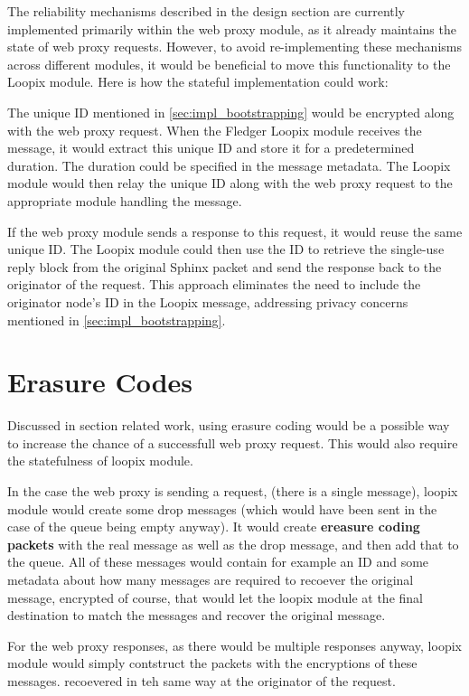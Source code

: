 \documentclass[a4paper,11pt,oneside]{report}
\begin{document}
The reliability mechanisms described in the design section are currently implemented primarily within the web proxy module, as it already maintains the state of web proxy requests. However, to avoid re-implementing these mechanisms across different modules, it would be beneficial to move this functionality to the Loopix module. Here is how the stateful implementation could work:

The unique ID mentioned in \autoref{sec:impl_bootstrapping} would be encrypted along with the web proxy request. When the Fledger Loopix module receives the message, it would extract this unique ID and store it for a predetermined duration. The duration could be specified in the message metadata. The Loopix module would then relay the unique ID along with the web proxy request to the appropriate module handling the message.

If the web proxy module sends a response to this request, it would reuse the same unique ID. The Loopix module could then use the ID to retrieve the single-use reply block from the original Sphinx packet and send the response back to the originator of the request. This approach eliminates the need to include the originator node's ID in the Loopix message, addressing privacy concerns mentioned in \autoref{sec:impl_bootstrapping}.

\section{Erasure Codes}
Discussed in section related work, using erasure coding would be a possible way to increase the chance of a successfull web proxy request. This would also require the statefulness of loopix module.

In the case the web proxy is sending a request, (there is a single message), loopix module would create some drop messages (which would have been sent in the case of the queue being empty anyway). It would create \textbf{ereasure coding packets} with the real message as well as the drop message, and then add that to the queue. All of these messages would contain for example an ID and some metadata about how many messages are required to recoever the original message, encrypted of course, that would let the loopix module at the final destination to match the messages and recover the original message.

For the web proxy responses, as there would be multiple responses anyway, loopix module would simply contstruct the packets with the encryptions of these messages. recoevered in teh same way at the originator of the request.
\end{document}
